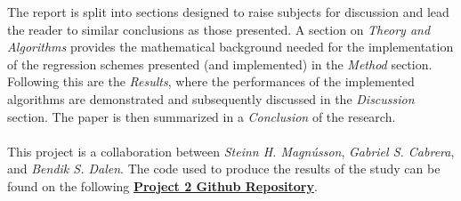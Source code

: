     The report is split into sections designed to raise subjects for discussion and lead the reader to similar conclusions as those presented. A section on \textit{Theory and Algorithms} provides the mathematical background needed for the implementation of the regression schemes presented (and implemented) in the \textit{Method} section. Following this are the \textit{Results}, where the performances of the implemented algorithms are demonstrated and subsequently discussed in the \textit{Discussion} section. The paper is then summarized in a \textit{Conclusion} of the research.\\\\
    This project is a collaboration between \textit{Steinn H. Magnússon}, \textit{Gabriel S. Cabrera}, and \textit{Bendik S. Dalen}. The code used to produce the results of the study can be found on the following \href{https://github.com/GabrielSCabrera/MachineLearning/tree/master/FYS-STK4155/Project_2/Gabriel/project}{\textbf{Project 2 Github Repository}}. 